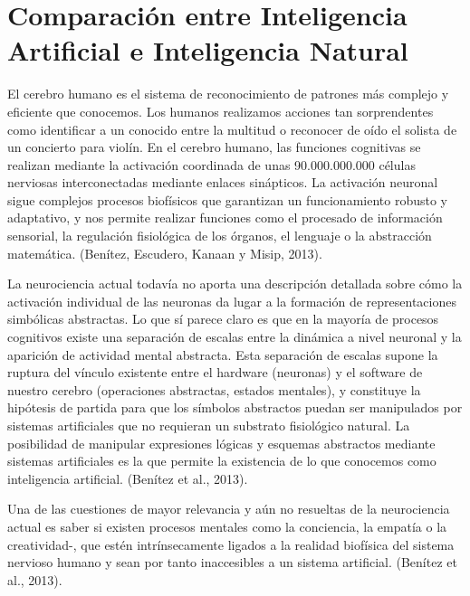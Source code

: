 \begin{table}[H]
\begin{turn}{90}
\begin{tabular}{|l|l|}
\end{tabular}
\end{turn}
\end{table}

\section{Comparación entre Inteligencia Artificial e Inteligencia Natural}  %

El cerebro humano es el sistema de reconocimiento de patrones más complejo y eficiente que conocemos. Los humanos realizamos acciones tan sorprendentes como identificar a un conocido entre la multitud o reconocer de oído el solista de un concierto para violín. En el cerebro humano, las funciones cognitivas se realizan mediante la activación coordinada de unas 90.000.000.000 células nerviosas interconectadas mediante enlaces sinápticos. La activación neuronal sigue complejos procesos biofísicos que garantizan un funcionamiento robusto y adaptativo, y nos permite realizar funciones como el procesado de información sensorial, la regulación fisiológica de los órganos, el lenguaje o la abstracción matemática. (Benítez, Escudero, Kanaan y Misip, 2013).

La neurociencia actual todavía no aporta una descripción detallada sobre cómo la activación individual de las neuronas da lugar a la formación de representaciones simbólicas abstractas. Lo que sí parece claro es que en la mayoría de procesos cognitivos existe una separación de escalas entre la dinámica a nivel neuronal y la aparición de actividad mental abstracta. Esta separación de escalas supone la ruptura del vínculo existente entre el hardware (neuronas) y el software de nuestro cerebro (operaciones abstractas, estados mentales), y constituye la hipótesis de partida para que los símbolos abstractos puedan ser manipulados por sistemas artificiales que no requieran un substrato fisiológico natural. La posibilidad de manipular expresiones lógicas y esquemas abstractos mediante sistemas artificiales es la que permite la existencia de lo que conocemos como inteligencia artificial. (Benítez et al., 2013).

Una de las cuestiones de mayor relevancia y aún no resueltas de la neurociencia actual es saber si existen procesos mentales como la conciencia, la empatía o la creatividad-, que estén intrínsecamente ligados a la realidad biofísica del sistema nervioso humano y sean por tanto inaccesibles a un sistema artificial. (Benítez et al., 2013).

